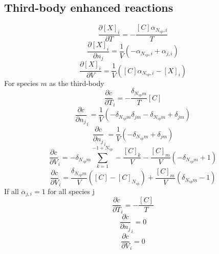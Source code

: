 \documentclass[a4paper,10pt]{article}
\newcommand{\ns}{N_{sp}}
\begin{document}
\subsection{Third-body enhanced reactions}
\begin{dmath} \frac{\partial [X]_i }{\partial T } = - \frac{[C] \alpha_{\ns,i}}{T}\end{dmath} 
\begin{dmath} \frac{\partial [X]_i }{\partial {n_j} } = \frac{1}{V} \left(- \alpha_{\ns,i} + \alpha_{j,i}\right)\end{dmath} 
\begin{dmath} \frac{\partial [X]_i }{\partial V } = \frac{1}{V} \left([C] \alpha_{\ns,i} - [X]_{i}\right)\end{dmath} 
For species $m$ as the third-body
\begin{dmath} \frac{\partial c }{\partial T }_{i} = - \frac{\delta_{\ns m}}{T} [C]\end{dmath} 
\begin{dmath} \frac{\partial c }{\partial {n_j} }_{i} = \frac{1}{V} \left(- \delta_{\ns m} \delta_{j m} - \delta_{\ns m} + \delta_{j m}\right)\end{dmath} 
\begin{dmath} \frac{\partial c }{\partial {n_j} }_{i} = \frac{1}{V} \left(- \delta_{\ns m} + \delta_{j m}\right)\end{dmath} 
\begin{dmath} \frac{\partial c }{\partial V }_{i} = - \delta_{\ns m} \sum_{k=1}^{-1 + \ns} - \frac{[C]_{k}}{V} - \frac{[C]_{m}}{V} \left(- \delta_{\ns m} + 1\right)\end{dmath} 
\begin{dmath} \frac{\partial c }{\partial V }_{i} = \frac{\delta_{\ns m}}{V} \left([C] - [C]_{\ns}\right) + \frac{[C]_{m}}{V} \left(\delta_{\ns m} - 1\right)\end{dmath} 
If all $\alpha_{j, i} = 1$ for all species j
\begin{dmath} \frac{\partial c }{\partial T }_{i} = - \frac{[C]}{T}\end{dmath} 
\begin{dmath} \frac{\partial c }{\partial {n_j} }_{i} = 0\end{dmath} 
\begin{dmath} \frac{\partial c }{\partial V }_{i} = 0\end{dmath} 
\end{document}
